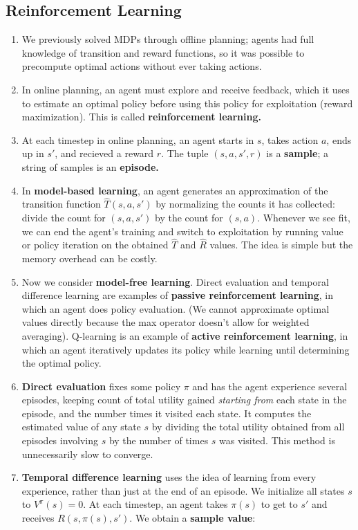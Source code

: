 \documentclass[10pt]{article}
\begin{document}
\begin{multicols}{2}
\begin{addmargin}[0.8em]{0.5em}
    \subsection{Reinforcement Learning}
    \begin{enumerate}[label=(\alph*)]
        \item We previously solved MDPs through offline planning; agents had full knowledge of transition and reward functions, so it was possible to precompute optimal actions without ever taking actions.
        \item In online planning, an agent must explore and receive feedback, which it uses to estimate an optimal policy before using this policy for exploitation (reward maximization). This is called \textbf{reinforcement learning.}
        \item At each timestep in online planning, an agent starts in $s$, takes action $a$, ends up in $s'$, and recieved a reward $r$. The tuple $(s,a,s',r)$ is a \textbf{sample}; a string of samples is an \textbf{episode.}
        \item In \textbf{model-based learning}, an agent generates an approximation of the transition function $\hat{T}(s,a,s')$ by normalizing the counts it has collected: divide the count for $(s,a,s')$ by the count for $(s,a)$. Whenever we see fit, we can end the agent's training and switch to exploitation by running value or policy iteration on the obtained $\hat{T}$ and $\hat{R}$ values. The idea is simple but the memory overhead can be costly.
        \item Now we consider \textbf{model-free learning}. Direct evaluation and temporal difference learning are examples of \textbf{passive reinforcement learning}, in which an agent does policy evaluation. (We cannot approximate optimal values directly because the max operator doesn't allow for weighted averaging). Q-learning is an example of \textbf{active reinforcement learning}, in which an agent iteratively updates its policy while learning until determining the optimal policy.
        \item \textbf{Direct evaluation} fixes some policy $\pi$ and has the agent experience several episodes, keeping count of total utility gained \textit{starting from} each state in the episode, and the number times it visited each state. It computes the estimated value of any state $s$ by dividing the total utility obtained from all episodes involving $s$ by the number of times $s$ was visited. This method is unnecessarily slow to converge.
        \item \textbf{Temporal difference learning} uses the idea of learning from every experience, rather than just at the end of an episode. We initialize all states $s$ to $V^{\pi}(s)=0$. At each timestep, an agent takes $\pi(s)$ to get to $s'$ and receives $R(s,\pi(s),s')$. We obtain a \textbf{sample value}: 

\end{enumerate}
\end{addmargin}
\end{multicols}
\end{document}
